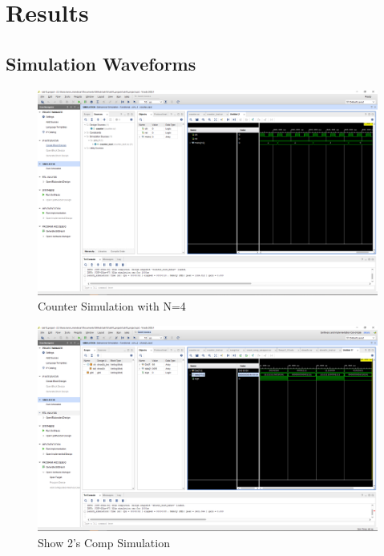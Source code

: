\documentclass[11pt]{article}
\begin{document}
\section*{Results}


\subsection*{Simulation Waveforms}
\begin{figure}[ht]\centering
\includegraphics[width=1\textwidth,trim=19cm 15cm 0.5cm 4.5cm,clip]{counter_test_screenshot}
	\caption{Counter Simulation with N=4}
	\label{fig:sim_with_table}
\end{figure}


\begin{figure}[ht]\centering
\includegraphics[width=1\textwidth,trim=19cm 15cm 0.5cm 4.5cm,clip]{show2c_test_screenshot}
	\caption{Show 2's Comp Simulation}
	\label{fig:sim_with_table}
\end{figure}

\FloatBarrier
\end{document}
